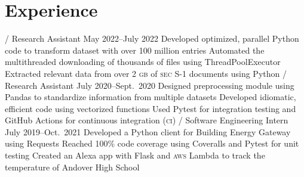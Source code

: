 \section{Experience}
\begin{doutline}
     / Research Assistant
    \hfill May 2022--July 2022
        \2 Developed optimized, parallel Python code to transform dataset with over 100 million entries
        \2 Automated the multithreaded downloading of thousands of files using ThreadPoolExecutor
        \2 Extracted relevant data from over 2 \textsc{gb} of \textsc{sec} S-1 documents using Python
     / Research Assistant
    \hfill July 2020--Sept.\ 2020
        \2 Designed preprocessing module using Pandas to standardize information from multiple datasets
            \3 Developed idiomatic, efficient code using vectorized functions
            \3 Used Pytest for integration testing and GitHub Actions for continuous integration (\textsc{ci})
     / Software Engineering Intern
    \hfill July 2019--Oct.\ 2021
        \2 Developed a Python client for Building Energy Gateway using Requests
            \3 Reached 100\% code coverage using Coveralls and Pytest for unit testing
        \2 Created an Alexa app with Flask and \textsc{aws} Lambda to track the temperature of Andover High School
\end{doutline}

